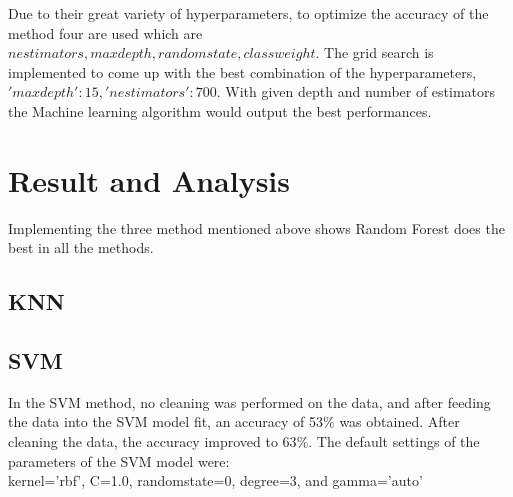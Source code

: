 \documentclass[conference]{IEEEtran}
\begin{document}
{Due to their great variety of hyperparameters, to optimize the accuracy of the method four are used which are $n estimators, max depth, random state, class weight$. The grid search is implemented to come up with the best combination of the hyperparameters, $ 'max depth': 15, 'n estimators': 700$. With given depth and number of estimators the Machine learning algorithm would output the best performances.\\
	
	
\section{Result and Analysis}
Implementing the three method mentioned above shows Random Forest does the best in all the methods. 
\subsection{KNN}
\subsection{SVM}
In the SVM method, no cleaning was performed on the data, and after feeding the data into the SVM model fit, an accuracy of 53$\%$ was obtained. After cleaning the data, the accuracy improved to 63$\%$. The default settings of the parameters of the SVM model were:\\

kernel='rbf', C=1.0, randomstate=0, degree=3, and gamma='auto' \\

}
\end{document}
